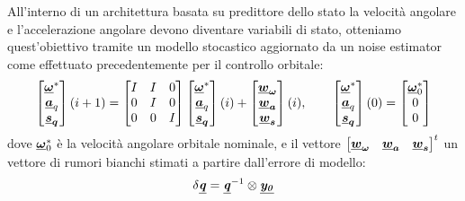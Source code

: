 All'interno di un architettura basata su predittore dello stato la velocità
angolare e l'accelerazione angolare devono diventare variabili di stato,
otteniamo quest'obiettivo tramite un modello stocastico aggiornato da un noise
estimator come effettuato precedentemente per il controllo orbitale:
\begin{equation}
	\begin{bmatrix}
		\boldsymbol{\underline{\omega}}^* \\
		\boldsymbol{\underline{a}}_q \\
		\boldsymbol{\underline{s}_q}
	\end{bmatrix}(i+1)
	=
	\begin{bmatrix}
		I & I & 0 \\
		0 & I & 0 \\
		0 & 0 & I \\
	\end{bmatrix}
	\begin{bmatrix}\boldsymbol{\underline{\omega}}^* \\ \boldsymbol{\underline{a}}_q \\
	\boldsymbol{\underline{s}_q}
	\end{bmatrix}(i)
	+		
	\begin{bmatrix}
		\boldsymbol{\underline{w}_\omega}\\
		\boldsymbol{\underline{w}_a}\\
		\boldsymbol{\underline{w}_s}\\	
	\end{bmatrix}(i)
	,\hspace{20pt}
	\begin{bmatrix}
		\boldsymbol{\underline{\omega}}^* \\
		\boldsymbol{\underline{a}}_q \\
		\boldsymbol{\underline{s}_q}
	\end{bmatrix}(0)
	=
	\begin{bmatrix}
		\boldsymbol{\underline{\omega}}^*_0 \\
		0 \\
		0 \\
	\end{bmatrix}
	\label{eq:attitude_state}
\end{equation}
dove $\boldsymbol{\underline{\omega}}^*_0$ è la velocità angolare orbitale nominale, e il
vettore
$\begin{bmatrix}\boldsymbol{\underline{w}_\omega}&\boldsymbol{\underline{w}_a}&\boldsymbol{\underline{w}_s}\end{bmatrix}^t$
un vettore di rumori bianchi stimati a partire dall'errore di modello:
\begin{equation}
\delta \underline{\boldsymbol{\mathit{q}}}=\underline{\boldsymbol{\mathit{q}}}^{-1} \otimes
\underline{\boldsymbol{\mathit{y_0}}}
\label{eq:reference_model_error}
\end{equation}
